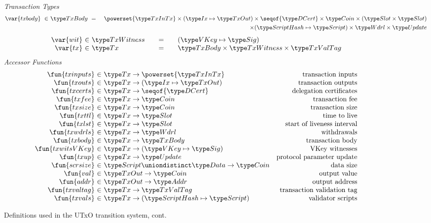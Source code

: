 \begin{figure*}[htb]
  \emph{Transaction Types}
  \begin{align*}
    \var{txbody} ~\in~
    & \TxBody ~=~
    & \powerset{\TxInTx} \times (\Ix \mapsto \TxOut) \times \seqof{\DCert}
      \times \Coin \times (\Slot\times\Slot) \\
    &~& \times (\HashScr \mapsto \Script) \times \Wdrl \times \Update 
  \end{align*}
  \begin{equation*}
    \begin{array}{r@{~\in~}l@{\qquad=\qquad}l}
      \var{wit} & \TxWitness & (\VKey \mapsto \Sig)
      \\
      \var{tx}
      & \Tx
      & \TxBody \times \TxWitness \times \TxValTag
    \end{array}
  \end{equation*}
  \emph{Accessor Functions}
  \begin{equation*}
    \begin{array}{r@{~\in~}lr}
      \fun{txinputs} & \Tx \to \powerset{\TxInTx} & \text{transaction inputs} \\
      \fun{txouts} & \Tx \to (\Ix \mapsto \TxOut) & \text{transaction outputs} \\
      \fun{txcerts} & \Tx \to \seqof{\DCert} & \text{delegation certificates} \\
      \fun{txfee} & \Tx \to \Coin & \text{transaction fee} \\
      \fun{txsize} & \Tx \to \Coin & \text{transaction size} \\
      \fun{txttl} & \Tx \to \Slot & \text{time to live} \\
      \fun{txlst} & \Tx \to \Slot & \text{start of liveness interval} \\
      \fun{txwdrls} & \Tx \to \Wdrl & \text{withdrawals} \\
      \fun{txbody} & \Tx \to \TxBody & \text{transaction body}\\
      \fun{txwitsVKey} & \Tx \to (\VKey \mapsto \Sig) & \text{VKey witnesses} \\
      \fun{txup} & \Tx \to \Update & \text{protocol parameter update} \\
      \fun{scrsize} & \Script \uniondistinct \Data \to \Coin & \text{data size} \\
      \fun{val} & \TxOut \to \Coin & \text{output value} \\
      \fun{addr} & \TxOut \to \Addr & \text{output address} \\
      \fun{txvaltag} & \Tx \to \TxValTag & \text{transaction validation tag}\\
      \fun{txvals} & \Tx \to (\HashScr \mapsto \Script) & \text{validator scripts}\\
    \end{array}
  \end{equation*}
  \caption{Definitions used in the UTxO transition system, cont.}
  \label{fig:defs:utxo-shelley-2}
\end{figure*}
